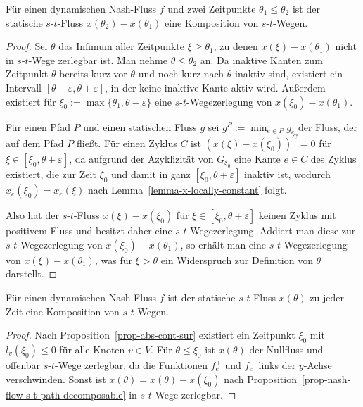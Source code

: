 \begin{proposition}\label{prop-nash-flow-s-t-path-decomposable}
	Für einen dynamischen Nash-Fluss $f$ und zwei Zeitpunkte $\theta_1 \leq \theta_2$ ist der statische $s$-$t$-Fluss $x(\theta_2) - x(\theta_1)$ eine Komposition von $s$-$t$-Wegen.
\end{proposition}
\begin{proof}
	Sei $\theta$ das Infimum aller Zeitpunkte $\xi\geq\theta_1$, zu denen $x(\xi) - x(\theta_1)$ nicht in $s$-$t$-Wege zerlegbar ist.
	Man nehme $\theta \leq \theta_2$ an.
	Da inaktive Kanten zum Zeitpunkt $\theta$ bereits kurz vor $\theta$ und noch kurz nach $\theta$ inaktiv sind, existiert ein Intervall $[\theta - \varepsilon, \theta + \varepsilon]$, in der keine inaktive Kante aktiv wird.
	Außerdem existiert für $\xi_0 := \max \{ \theta_1, \theta - \varepsilon \}$ eine $s$-$t$-Wegezerlegung von $x(\xi_0) - x(\theta_1)$.
	
	Für einen Pfad $P$ und einen statischen Fluss $g$ sei $g^P := \min_{e\in P} g_e$ der Fluss, der auf dem Pfad $P$ fließt.
	Für einen Zyklus $C$ ist $(x(\xi) - x(\xi_0))^C = 0$ für $\xi\in [\xi_0, \theta+\varepsilon]$, da aufgrund der Azyklizität von $G_{\xi_0}$ eine Kante $e\in C$ des Zyklus existiert, die zur Zeit $\xi_0$ und damit in ganz $[\xi_0, \theta+\varepsilon]$ inaktiv ist, wodurch $x_e(\xi_0) = x_e(\xi)$ nach Lemma~\ref{lemma-x-locally-constant} folgt.
	
	Also hat der $s$-$t$-Fluss $x(\xi) - x(\xi_0)$ für $\xi\in [\xi_0, \theta + \varepsilon]$ keinen Zyklus mit positivem Fluss und besitzt daher eine $s$-$t$-Wegezerlegung.
	Addiert man diese zur $s$-$t$-Wegezerlegung von $x(\xi_0) - x(\theta_1)$, so erhält man eine $s$-$t$-Wegezerlegung von $x(\xi) - x(\theta_1)$, was für $\xi > \theta$ ein Widerspruch zur Definition von $\theta$ darstellt.
\end{proof}

\begin{corollary}
	Für einen dynamischen Nash-Fluss $f$ ist der statische $s$-$t$-Fluss $x(\theta)$ zu jeder Zeit eine Komposition von $s$-$t$-Wegen.
\end{corollary}
\begin{proof}
	Nach Proposition~\ref{prop-abs-cont-sur} existiert ein Zeitpunkt $\xi_0$ mit $l_v(\xi_0) \leq 0$ für alle Knoten $v\in V$.
	Für $\theta \leq \xi_0$ ist $x(\theta)$ der Nullfluss und offenbar $s$-$t$-Wege zerlegbar, da die Funktionen $f_e^+$ und $f_e^-$ links der $y$-Achse verschwinden.
	Sonst ist $x(\theta)=  x(\theta) - x(\xi_0)$ nach Proposition~\ref{prop-nash-flow-s-t-path-decomposable} in $s$-$t$-Wege zerlegbar.
\end{proof}